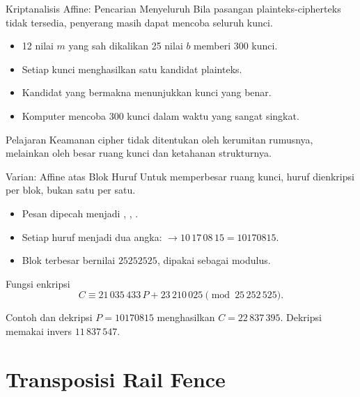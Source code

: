 \documentclass[aspectratio=169,11pt]{beamer}
\begin{document}
\begin{frame}{Kriptanalisis Affine: Pencarian Menyeluruh}
    Bila pasangan plainteks-cipherteks tidak tersedia, penyerang masih dapat
    mencoba seluruh kunci.
    \begin{itemize}
        \item 12 nilai $m$ yang sah dikalikan 25 nilai $b$ memberi 300 kunci.
        \item Setiap kunci menghasilkan satu kandidat plainteks.
        \item Kandidat yang bermakna menunjukkan kunci yang benar.
        \item Komputer mencoba 300 kunci dalam waktu yang sangat singkat.
    \end{itemize}
    \vspace{0.15cm}
    \begin{block}{Pelajaran}
        \footnotesize
        Keamanan cipher tidak ditentukan oleh kerumitan rumusnya, melainkan
        oleh besar ruang kunci dan ketahanan strukturnya.
    \end{block}
\end{frame}

\begin{frame}{Varian: Affine atas Blok Huruf}
    \footnotesize
    Untuk memperbesar ruang kunci, huruf dienkripsi per blok, bukan satu per
    satu.
    \begin{itemize}
        \item Pesan  dipecah menjadi ,
              , .
        \item Setiap huruf menjadi dua angka:
               $\rightarrow 10\,17\,08\,15=10170815$.
        \item Blok terbesar  bernilai $25252525$, dipakai sebagai
              modulus.
    \end{itemize}
    \begin{block}{Fungsi enkripsi}
        \[
            C\equiv 21\,035\,433\,P+23\,210\,025 \pmod{25\,252\,525}.
        \]
    \end{block}
    \begin{exampleblock}{Contoh dan dekripsi}
        $P=10170815$ menghasilkan $C=22\,837\,395$. Dekripsi memakai invers
        $11\,837\,547$.
    \end{exampleblock}
\end{frame}

\section{Transposisi Rail Fence}
\end{document}
